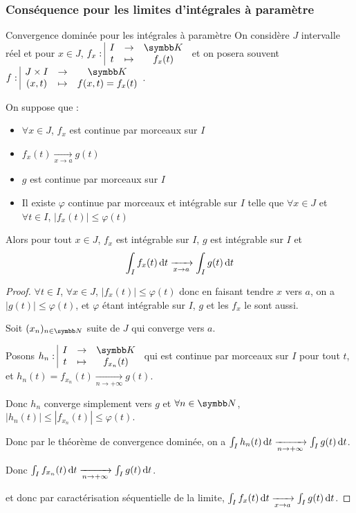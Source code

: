 \subsubsection{Conséquence pour les limites d'intégrales à paramètre}

\begin{proposition}{Convergence dominée pour les intégrales à paramètre}{}
    On considère $J$ intervalle réel et pour $x \in J$, $\fonction {f_x}{I}{\K}{t}{f_x(t)}$
    et on posera souvent $\fonction {f} {J \times I}{\K}{(x, t)}{f(x, t) = f_x(t)}$.

    On suppose que : 
    \begin{itemize}
        \item $\forall x \in J$, $f_x$ est continue par morceaux sur $I$
        \item $f_x(t) \xrightarrow[x \to a]{} g(t)$
        \item $g$ est continue par morceaux sur $I$
        \item Il existe $\varphi$ continue par morceaux et intégrable sur $I$ telle que 
        $\forall x \in J$ et $\forall t \in I$, $|f_x(t)| \leqslant \varphi(t)$
    \end{itemize}

    Alors pour tout $x \in J$, $f_x$ est intégrable sur $I$, $g$ est intégrable sur $I$ et 
    $$\int_I f_x(t) \,\mathrm{d}t \xrightarrow[x \to a]{} \int_I g(t) \,\mathrm{d}t$$
\end{proposition}


\begin{proof}
    $\forall t \in I$, $\forall x \in J$, $|f_x(t)| \leqslant \varphi(t)$ donc en faisant tendre 
    $x$ vers $a$, on a $|g(t)| \leqslant \varphi(t)$, et $\varphi$ étant intégrable sur 
    $I$, $g$ et les $f_x$ le sont aussi. 

    Soit $(x_n)_{n \in \N}$ suite de $J$ qui converge vers $a$. 

    Posons $\fonction {h_n}{I}{\K}{t}{f_{x_n}(t)}$ qui est continue par morceaux sur $I$ pour 
    tout $t$, et $h_n(t) = f_{x_n}(t) \xrightarrow[n \to + \infty]{} g(t)$.

    Donc $h_n$ converge simplement vers $g$ et $\forall n \in \N$, $|h_n(t)| \leqslant |f_{x_n}(t)| \leqslant \varphi(t)$.

    Donc par le théorème de convergence dominée, on a $\int_I h_n(t) \,\mathrm{d}t \xrightarrow[n \to + \infty]{} \int_I g(t) \,\mathrm{d}t$.

    Donc $\int_I f_{x_n}(t) \,\mathrm{d}t \xrightarrow[n \to + \infty]{} \int_I g(t) \,\mathrm{d}t$.

    et donc par caractérisation séquentielle de la limite, $\int_I f_x(t) \,\mathrm{d}t \xrightarrow[x \to a]{} \int_I g(t) \,\mathrm{d}t$.
\end{proof}

